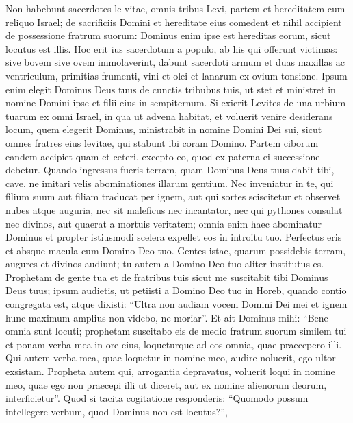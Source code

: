 \begin{biblechapter}
\begin{biblechapter}
\begin{biblechapter}
\begin{biblechapter}
\begin{biblechapter}
\begin{biblechapter}
\begin{biblechapter}
\begin{biblechapter}
\begin{biblechapter}
\begin{biblechapter}
\begin{biblechapter}
\begin{biblechapter}
\begin{biblechapter}
\begin{biblechapter}
\begin{biblechapter}
\begin{biblechapter}
\begin{biblechapter}
\begin{biblechapter}
\verse Non habebunt sacerdotes le vitae, omnis tribus Levi, partem et hereditatem cum reliquo Israel; de sacrificiis Domini et hereditate eius comedent 
\verse et nihil accipient de possessione fratrum suorum: Dominus enim ipse est hereditas eorum, sicut locutus est illis.
 \verse Hoc erit ius sacerdotum a populo, ab his qui offerunt victimas: sive bovem sive ovem immolaverint, dabunt sacerdoti armum et duas maxillas ac ventriculum, 
\verse primitias frumenti, vini et olei et lanarum ex ovium tonsione. 
\verse Ipsum enim elegit Dominus Deus tuus de cunctis tribubus tuis, ut stet et ministret in nomine Domini ipse et filii eius in sempiternum.
 \verse Si exierit Levites de una urbium tuarum ex omni Israel, in qua ut advena habitat, et voluerit venire desiderans locum, quem elegerit Dominus, 
\verse ministrabit in nomine Domini Dei sui, sicut omnes fratres eius levitae, qui stabunt ibi coram Domino. 
\verse Partem ciborum eandem accipiet quam et ceteri, excepto eo, quod ex paterna ei successione debetur.
 \verse Quando ingressus fueris terram, quam Dominus Deus tuus dabit tibi, cave, ne imitari velis abominationes illarum gentium. 
\verse Nec inveniatur in te, qui filium suum aut filiam traducat per ignem, aut qui sortes sciscitetur et observet nubes atque auguria, nec sit maleficus 
\verse nec incantator, nec qui pythones consulat nec divinos, aut quaerat a mortuis veritatem; 
\verse omnia enim haec abominatur Dominus et propter istiusmodi scelera expellet eos in introitu tuo. 
\verse Perfectus eris et absque macula cum Domino Deo tuo. 
\verse Gentes istae, quarum possidebis terram, augures et divinos audiunt; tu autem a Domino Deo tuo aliter institutus es.
 \verse Prophetam de gente tua et de fratribus tuis sicut me suscitabit tibi Dominus Deus tuus; ipsum audietis, 
\verse ut petiisti a Domino Deo tuo in Horeb, quando contio congregata est, atque dixisti: “Ultra non audiam vocem Domini Dei mei et ignem hunc maximum amplius non videbo, ne moriar”. 
\verse Et ait Dominus mihi: “Bene omnia sunt locuti; 
\verse prophetam suscitabo eis de medio fratrum suorum similem tui et ponam verba mea in ore eius, loqueturque ad eos omnia, quae praecepero illi. 
\verse Qui autem verba mea, quae loquetur in nomine meo, audire noluerit, ego ultor exsistam. 
\verse Propheta autem qui, arrogantia depravatus, voluerit loqui in nomine meo, quae ego non praecepi illi ut diceret, aut ex nomine alienorum deorum, interficietur”. 
\verse Quod si tacita cogitatione responderis: “Quomodo possum intellegere verbum, quod Dominus non est locutus?”, 

\end{biblechapter}
\end{biblechapter}
\end{biblechapter}
\end{biblechapter}
\end{biblechapter}
\end{biblechapter}
\end{biblechapter}
\end{biblechapter}
\end{biblechapter}
\end{biblechapter}
\end{biblechapter}
\end{biblechapter}
\end{biblechapter}
\end{biblechapter}
\end{biblechapter}
\end{biblechapter}
\end{biblechapter}
\end{biblechapter}
